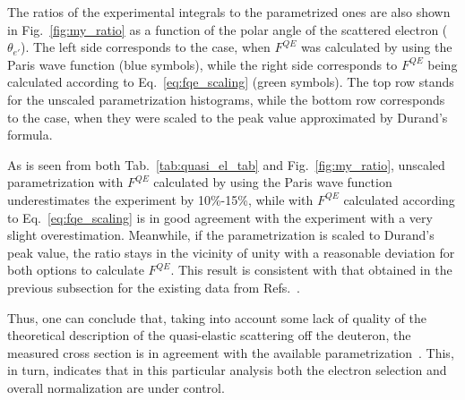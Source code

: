 The ratios of the experimental integrals to the parametrized ones are also shown in Fig.~\ref{fig:my_ratio} as a function of the polar angle of the scattered electron ($\theta_{e'}$). The left side corresponds to the case, when $F^{QE}$ was calculated by using the Paris wave function (blue symbols), while the right side corresponds to $F^{QE}$ being calculated according to Eq.~\eqref{eq:fqe_scaling} (green symbols). The top row stands for the unscaled parametrization histograms, while the bottom row corresponds to the case, when they were scaled to the peak value approximated by Durand's formula. 

As is seen from both Tab.~\ref{tab:quasi_el_tab} and Fig.~\ref{fig:my_ratio}, unscaled parametrization with $F^{QE}$ calculated by using the Paris wave function underestimates the experiment by 10\%-15\%, while with $F^{QE}$ calculated according to Eq.~\eqref{eq:fqe_scaling} is in good agreement with the experiment with a very slight overestimation. Meanwhile, if the parametrization is scaled to Durand's peak value, the ratio stays in the vicinity of unity with a reasonable deviation for both options to calculate $F^{QE}$. This result is consistent with that obtained in the previous subsection for the existing data from Refs.~\cite{Hanson:1973vf,Rock:1991jy,Rock_SLAC}.

Thus, one can conclude that, taking into account some lack of quality of the theoretical description of the quasi-elastic scattering off the deuteron, the measured cross section is in agreement with the available parametrization~\cite{Bosted_fit,Bosted:2007xd}. This, in turn, indicates that in this particular analysis both the electron selection and overall normalization are under control.







